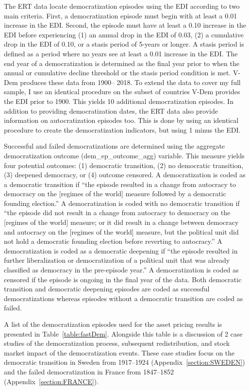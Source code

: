 \documentclass[12pt]{article}
\numberwithin{equation}{section}
\begin{document}
The ERT data locate democratization episodes using the EDI according to two main criteria. First, a democratization episode must begin with at least a 0.01 increase in the EDI. Second, the episode must have at least a 0.10 increase in the EDI before experiencing (1) an annual drop in the EDI of 0.03, (2) a cumulative drop in the EDI of 0.10, or a stasis period of 5-years or longer. A stasis period is defined as a period where no years see at least a 0.01 increase in the EDI.  The end year of a democratization is determined as the final year prior to when the annual or cumulative decline threshold or the stasis period condition is met.  V-Dem produces these data from 1900-- 2018. To extend the data to cover my full sample, I use an identical procedure on the subset of countries V-Dem provides the EDI prior to 1900. This yields 10 additional democratization episodes.  In addition to providing democratization dates, the ERT data also provide information on autocratization episodes too. This is done by using an identical procedure to create the democratization indicators, but using 1 minus the EDI. 

Successful and failed democratizations are determined using the aggregate democratization outcome (dem\_ep\_outcome\_agg) variable.  This measure yields four potential outcomes: (1) democratic transition, (2) no democratic transition, (3) deepened democracy, or (4) outcome censored. A democratization is coded as a democratic transition if ``the episode resulted in a change from autocracy to democracy on the [regimes of the world] measure followed by a democratic founding election.'' A democratization is coded with no democratic transition if ``the episode did not result in a change from autocracy to democracy on the [regimes of the world] measure; or it did result in a change between democracy and autocracy on the [regimes of the world] measure, but the political unit did not hold a democratic founding election before reverting to autocracy.'' A democratization is coded as a democratic deepening if ``the episode resulted in further liberalization or democratization of a political unit that was already classified as democracy in the pre-episode year.'' A democratization is coded as censored if the episode is ongoing in the final year of the data.  Both democratic transition and democratic deepening episodes are coded as successful democratizations whereas episodes without a democratic transition are coded as failed.

A list of the democratization episodes used for the asset pricing results is presented in Table~\ref{table:fastDem}. Alongside this table is a discussion of 2 case studies of the democratization process, subsequent redistribution, and stock market impact of the democratization events. These case studies focus on the democratic transition in Sweden from 1917--1924 (Appendix~\ref{section:SWEDEN}) and the failed democratization in France from 1847--1852 (Appendix~\ref{section:FRANCE}).
\end{document}
